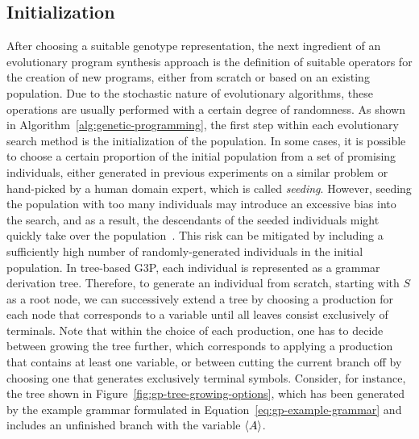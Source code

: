 \subsection{Initialization}
\label{sec:gggp-initialization}
After choosing a suitable genotype representation, the next ingredient of an evolutionary program synthesis approach is the definition of suitable operators for the creation of new programs, either from scratch or based on an existing population.
Due to the stochastic nature of evolutionary algorithms, these operations are usually performed with a certain degree of randomness.
As shown in Algorithm~\ref{alg:genetic-programming}, the first step within each evolutionary search method is the initialization of the population. 
In some cases, it is possible to choose a certain proportion of the initial population from a set of promising individuals, either generated in previous experiments on a similar problem or hand-picked by a human domain expert, which is called \emph{seeding}.
However, seeding the population with too many individuals may introduce an excessive bias into the search, and as a result, the descendants of the seeded individuals might quickly take over the population~\cite{poli2008field}.
This risk can be mitigated by including a sufficiently high number of randomly-generated individuals in the initial population. 
In tree-based G3P, each individual is represented as a grammar derivation tree.
Therefore, to generate an individual from scratch, starting with $S$ as a root node, we can successively extend a tree by choosing a production for each node that corresponds to a variable until all leaves consist exclusively of terminals.
Note that within the choice of each production, one has to decide between growing the tree further, which corresponds to applying a production that contains at least one variable, or between cutting the current branch off by choosing one that generates exclusively terminal symbols.
Consider, for instance, the tree shown in Figure~\ref{fig:gp-tree-growing-options}, which has been generated by the example grammar formulated in Equation~\eqref{eq:gp-example-grammar} and includes an unfinished branch with the variable $\langle A \rangle$.
